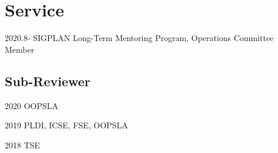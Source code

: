 \documentclass[12pt,letterpaper]{report}
\newcommand{\listitemspace}{0.15em}
\renewenvironment{itemize}
{\begin{list}{}{\setlength{\leftmargin}{0em}
			\setlength{\parskip}{0em}
			\setlength{\itemsep}{\listitemspace}
			\setlength{\parsep}{\listitemspace}}}
	{\end{list}}
\begin{document}
	\vspace{-0.5em}
	\section*{Service}
	\begin{tablist}
		\item[2020.8-] \tab SIGPLAN Long-Term Mentoring Program, Operations Committee Member
	\end{tablist}
	
	\subsection*{Sub-Reviewer}
	\begin{tablist}
		\item[2020] \tab OOPSLA
		\item[2019] \tab PLDI, ICSE, FSE, OOPSLA
		\item[2018] \tab TSE
	\end{tablist}
	
	
%	
%		
%		
%		
%		
%	
%	
%		
%		
%		
%		
	
\end{document}

